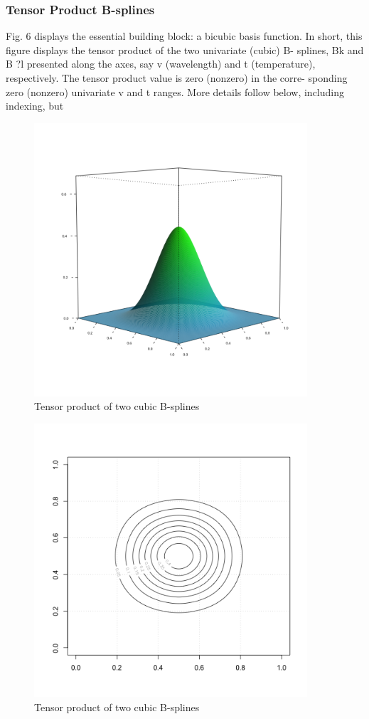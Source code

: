 \documentclass[12pt]{article}
\newcommand*\outlineskeleton{\color{green}}
\begin{document}
{\subsubsection{{\outlineskeleton Tensor Product B-splines}}

Fig. 6 displays the essential building block: a bicubic basis function. In short, this figure displays the tensor product of the two univariate (cubic) B- splines, Bk and B ?l presented along the axes, say v (wavelength) and t (temperature), respectively. The tensor product value is zero (nonzero) in the corre- sponding zero (nonzero) univariate v and t ranges. More details follow below, including indexing, but

\begin{figure}[H]
  \centering
 \graphicspath{{img/}}
  \includegraphics[width=4in, height=4in]{bicubic_bspline.png}
  \caption{Tensor product of two cubic B-splines}\label{bicubic_bspline}
\end{figure}

\begin{figure}[H]
  \centering
  \graphicspath{{img/}}
  \includegraphics[width=4in, height=4in]{bicubic_bspline_contour.png}
  \caption{Tensor product of two cubic B-splines}\label{bicubic_bspline_contour}
\end{figure}

}
\end{document}
